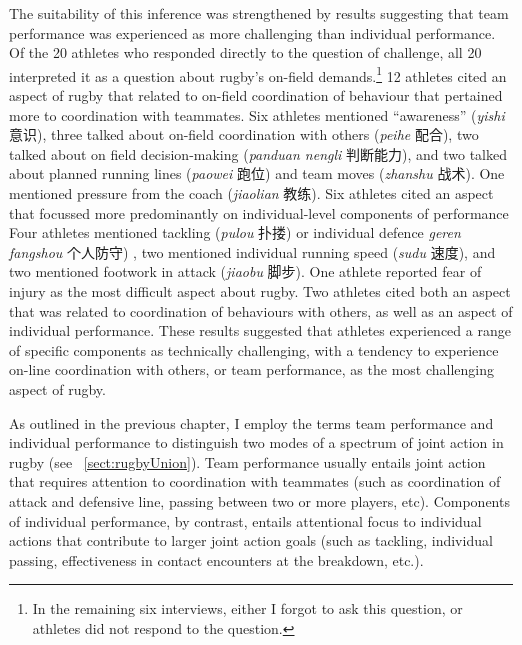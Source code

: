 \begin{CJK}{UTF8}{gbsn}
The suitability of this inference was strengthened by results suggesting that team performance was experienced as more challenging than individual performance.  Of the 20 athletes who responded directly to the question of challenge, all 20 interpreted it as a question about rugby's on-field demands.\footnote{In the remaining six interviews, either I forgot to ask this question, or athletes did not respond to the question.}  12 athletes cited an aspect of rugby that related to on-field coordination of behaviour that pertained more to coordination with teammates. Six athletes mentioned  ``awareness'' (\textit{yishi} 意识), three talked about on-field coordination with others (\textit{peihe} 配合), two talked about on field decision-making (\textit{panduan nengli} 判断能力), and two talked about planned running lines (\textit{paowei} 跑位) and team moves (\textit{zhanshu} 战术).  One mentioned pressure from the coach (\textit{jiaolian} 教练).
Six athletes cited an aspect that focussed more predominantly on individual-level  components of performance
Four athletes mentioned tackling (\textit{pulou} 扑搂) or individual defence \textit{geren fangshou} 个人防守) , two mentioned individual running speed (\textit{sudu} 速度), and two mentioned footwork in attack (\textit{jiaobu} 脚步).  One athlete reported fear of injury as the most difficult aspect about rugby. Two athletes cited both an aspect that was related to coordination of behaviours with others, as well as an aspect of individual performance.  These results suggested that athletes experienced a range of specific components as technically challenging, with a tendency to experience on-line coordination with others, or team performance, as the most challenging aspect of rugby.

As outlined in the previous chapter, I employ the terms team performance and individual performance to distinguish two modes of a spectrum of joint action in rugby (see ~\ref{sect:rugbyUnion}).
Team performance usually entails joint action that requires attention to coordination with teammates (such as coordination of attack and defensive line, passing between two or more players, etc).  Components of individual performance, by contrast, entails attentional focus to individual actions that contribute to larger joint action goals (such as tackling, individual passing, effectiveness in contact encounters at the breakdown, etc.).


\end{CJK}
